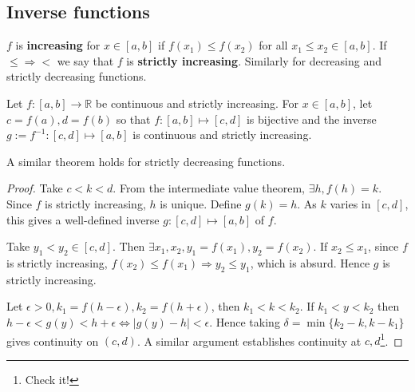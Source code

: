 \subsection{Inverse functions}
\begin{definition}
    $f$ is \textbf{increasing} for $ x\in [a,b] $ if $ f(x_1)\le f(x_2) $ for all $x_1\le x_2\in [a,b]$. If $ \le \Rightarrow < $ we say that $f$ is \textbf{strictly increasing}. Similarly for decreasing and strictly decreasing functions.
\end{definition}

\begin{theorem}\label{thm:existence of inverse function}
    Let $f:[a,b]\to \mathbb{R}$ be continuous and strictly increasing. For $ x\in [a,b] $, let $ c=f(a),d=f(b) $ so that $ f:[a,b] \mapsto [c,d] $ is bijective and the inverse $g:=f^{-1}:[c,d]\mapsto [a,b]$ is continuous and strictly increasing. 
\end{theorem}
\begin{remark}
    A similar theorem holds for strictly decreasing functions.
\end{remark}
\begin{proof}
    Take $ c<k<d $. From the intermediate value theorem, $ \exists h,f(h)=k $. Since $f$ is strictly increasing, $h$ is unique. Define $ g(k) = h $. As $k$ varies in $[c,d]$, this gives a well-defined inverse $ g:[c,d] \mapsto [a,b] $ of $f$. 
    
    Take $y_1<y_2\in [c,d]$. Then $ \exists x_1,x_2, y_1=f(x_1),y_2=f(x_2) $. If $ x_2\le x_1 $, since $f$ is strictly increasing, $ f(x_2)\le f(x_1) \Rightarrow y_2\le y_1 $, which is absurd. Hence $g$ is strictly increasing.

    Let $ \epsilon>0,k_1=f(h-\epsilon),k_2=f(h+\epsilon) $, then $ k_1<k<k_2 $. If $ k_1<y<k_2 $ then $ h-\epsilon<g(y)<h+\epsilon \Leftrightarrow |g(y)-h|<\epsilon $. Hence taking $ \delta = \min \{k_2-k,k-k_1\} $ gives continuity on $(c,d)$. A similar argument establishes continuity at $c,d$\footnote{Check it!}.
\end{proof}